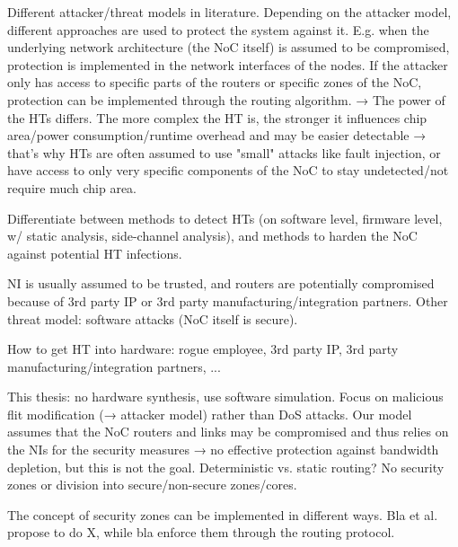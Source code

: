 Different attacker/threat models in literature. Depending on the attacker model, different approaches are used to protect the system against it.
E.g. when the underlying network architecture (the NoC itself) is assumed to be compromised, protection is implemented in the network interfaces
of the nodes. If the attacker only has access to specific parts of the routers or specific zones of the NoC, protection can be implemented through
the routing algorithm. → The power of the HTs differs. The more complex the HT is, the stronger it influences chip area/power consumption/runtime
overhead and may be easier detectable → that's why HTs are often assumed to use "small" attacks like fault injection, or have access to only very
specific components of the NoC to stay undetected/not require much chip area.

Differentiate between methods to detect HTs (on software level, firmware level, w/ static analysis, side-channel analysis), and methods to harden
the NoC against potential HT infections.

NI is usually assumed to be trusted, and routers are potentially compromised because of 3rd party IP or 3rd party manufacturing/integration
partners. Other threat model: software attacks (NoC itself is secure).

How to get HT into hardware: rogue employee, 3rd party IP, 3rd party manufacturing/integration partners, ...

This thesis: no hardware synthesis, use software simulation. Focus on malicious flit modification (→ attacker model) rather than DoS attacks. Our
model assumes that the NoC routers and links may be compromised and thus relies on the NIs for the security measures → no effective protection
against bandwidth depletion, but this is not the goal.
Deterministic vs. static routing? No security zones or division into secure/non-secure zones/cores.

The concept of security zones can be implemented in different ways. Bla et al. propose to do X, while bla enforce them through the routing protocol.

